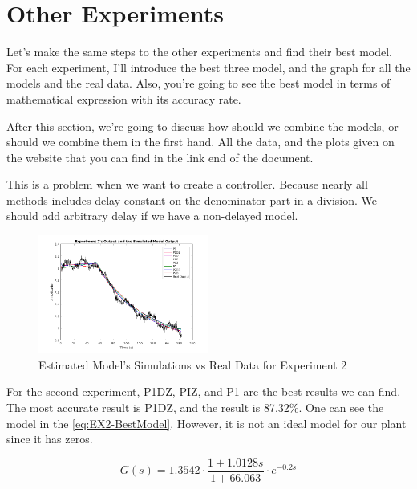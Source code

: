 \documentclass[11pt,a4paper,twocolumn]{article}
\begin{document}

\section{Other Experiments}
\label{sec:otherexperiments}
Let's make the same steps to the other experiments and find their best model. For each experiment, I'll introduce the best three model, and the graph for all the models and the real data. Also, you're going to see the best model in terms of mathematical expression with its accuracy rate.

After this section, we're going to discuss how should we combine the models, or should we combine them in the first hand. All the data, and the plots given on the website that you can find in the link end of the document.

This is a problem when we want to create a controller. Because nearly all methods includes delay constant on the denominator part in a division. We should add arbitrary delay if we have a non-delayed model.

\begin{figure}[H]
    \centering
    \includegraphics[width=0.5\textwidth]{Graphs/Exp2Output-SimulatedModel.png}
    \caption{Estimated Model's Simulations vs Real Data for Experiment 2}
\end{figure}


For the second experiment, P1DZ, PIZ, and P1 are the best results we can find. The most accurate result is P1DZ, and the result is 87.32\%. One can see the model in the \eqref{eq:EX2-BestModel}. However, it is not an ideal model for our plant since it has zeros.

\begin{equation}
    G(s) = 1.3542 \cdot \frac{1+1.0128s}{1+66.063} \cdot e^{-0.2s}
    \label{eq:EX2-BestModel}
\end{equation}
\end{document}
